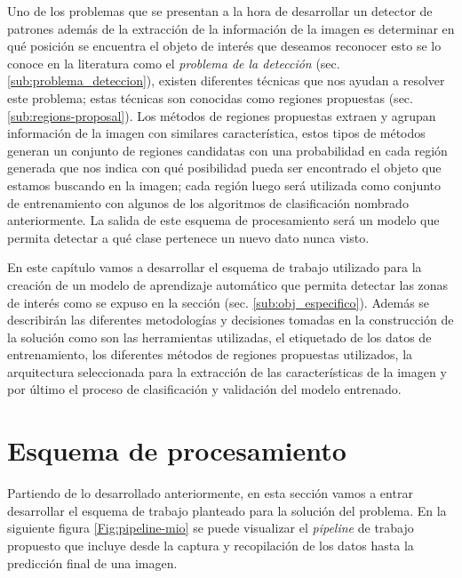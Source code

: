 Uno de los problemas que se presentan a la hora de desarrollar un detector de patrones además de la extracción de la información de la imagen es determinar en qué posición se encuentra el objeto de interés que deseamos reconocer esto se lo conoce en la literatura como el \textit{problema de la detección} (sec. \ref{sub:problema_deteccion}), existen diferentes técnicas que nos ayudan a resolver este problema; estas técnicas son conocidas como regiones propuestas (sec. \ref{sub:regions-proposal}). Los métodos de regiones propuestas extraen y agrupan información de la imagen con similares característica, estos tipos de métodos generan un conjunto de regiones candidatas con una probabilidad en cada región generada que nos indica con qué posibilidad pueda ser encontrado el objeto que estamos buscando en la imagen; cada región luego será utilizada como conjunto de entrenamiento con algunos de los algoritmos de clasificación nombrado anteriormente. La salida de este esquema de procesamiento será un modelo que permita detectar a qué clase pertenece un nuevo dato nunca visto.

En este capítulo vamos a desarrollar el esquema de trabajo utilizado para la creación de un modelo de aprendizaje automático que permita detectar las zonas de interés como se expuso en la sección (sec. \ref{sub:obj_especifico}). Además se describirán las diferentes metodologías y decisiones tomadas en la construcción de la solución como son las herramientas utilizadas, el etiquetado de los datos de entrenamiento, los diferentes  métodos de regiones propuestas utilizados, la arquitectura seleccionada para la extracción de las características de la imagen y por último el proceso de clasificación y validación del modelo entrenado.




%


\section{Esquema de procesamiento}\label{sec: pipeline}

Partiendo de lo desarrollado anteriormente, en esta sección vamos a entrar desarrollar el esquema de trabajo planteado para la solución del problema. En la siguiente figura \ref{Fig:pipeline-mio} se puede visualizar el \textit{pipeline} de trabajo propuesto que incluye desde la captura y recopilación de los datos hasta la predicción final de una imagen.

